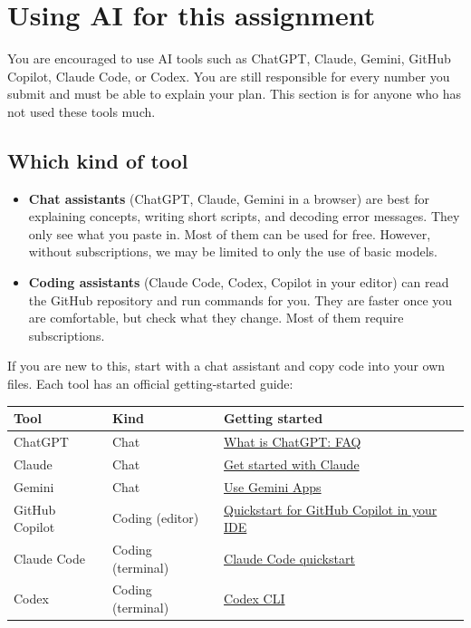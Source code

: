 \documentclass[10pt]{article}
\begin{document}
\section{Using AI for this assignment}\label{sec:ai}

You are encouraged to use AI tools such as ChatGPT, Claude, Gemini, GitHub
Copilot, Claude Code, or Codex. You are still responsible for every number you
submit and must be able to explain your plan. This section is for anyone who
has not used these tools much.

\subsection{Which kind of tool}
\begin{itemize}[leftmargin=*]
  \item \textbf{Chat assistants} (ChatGPT, Claude, Gemini in a browser) are best
    for explaining concepts, writing short scripts, and decoding error
    messages. They only see what you paste in. Most of them can be used for free. However, without subscriptions, we may be limited to only the use of basic models.
  \item \textbf{Coding assistants} (Claude Code, Codex, Copilot in your editor)
    can read the GitHub repository and run commands for you. They are faster once you
    are comfortable, but check what they change. Most of them require subscriptions.
\end{itemize}
If you are new to this, start with a chat assistant and copy code into your
own files. Each tool has an official getting-started guide:

\begin{center}
\small
\begin{tabularx}{\linewidth}{@{}l l X@{}}
\toprule
Tool & Kind & Getting started\\
\midrule
ChatGPT & Chat & \href{https://help.openai.com/en/articles/12677804-what-is-chatgpt-faq}{What is ChatGPT: FAQ}\\
Claude & Chat & \href{https://support.claude.com/en/articles/8114491-get-started-with-claude}{Get started with Claude}\\
Gemini & Chat & \href{https://support.google.com/gemini/answer/13275745}{Use Gemini Apps}\\
GitHub Copilot & Coding (editor) & \href{https://docs.github.com/en/copilot/get-started/quickstart-for-using-github-copilot-in-your-ide}{Quickstart for GitHub Copilot in your IDE}\\
Claude Code & Coding (terminal) & \href{https://code.claude.com/docs/en/quickstart}{Claude Code quickstart}\\
Codex & Coding (terminal) & \href{https://developers.openai.com/codex/cli}{Codex CLI}\\
\bottomrule
\end{tabularx}
\end{center}
\end{document}
